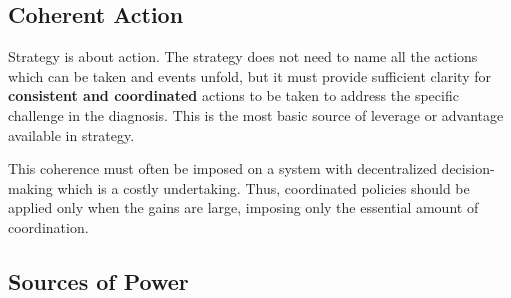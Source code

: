 \documentclass{article}
\begin{document}
\begin{multicols}{2}
\subsection{Coherent Action}

Strategy is about action. The strategy does not need to name all the actions which can be taken and events unfold, but it must provide sufficient clarity for \textbf{consistent and coordinated} actions to be taken to address the specific challenge in the diagnosis. This is the most basic source of leverage or advantage available in strategy.

This coherence must often be imposed on a system with decentralized decision-making which is a costly undertaking. Thus, coordinated policies should be applied only when the gains are large, imposing only the essential amount of coordination.

\end{multicols}

\begin{center}
\section{Sources of Power}
\end{center}
\end{document}
